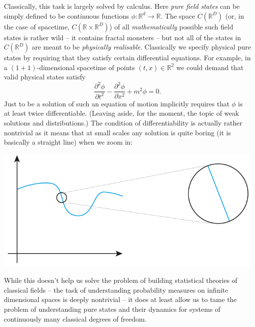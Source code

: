\documentclass[11pt]{amsart}
\theoremstyle{plain}%
\theoremstyle{definition}
\theoremstyle{remark}
\begin{document}
Classically, this task is largely solved by calculus. Here \emph{pure field states} can be simply defined to be continuous functions $\phi:\mathbb{R}^d\rightarrow \mathbb{R}$. The space $C(\mathbb{R}^D)$ (or, in the case of spacetime, $C(\mathbb{R}\times\mathbb{R}^D)$) of all \emph{mathematically} possible such field states is rather wild -- it contains fractal monsters -- but not all of the states in $C(\mathbb{R}^D)$ are meant to be \emph{physically realisable}. Classically we specify physical pure states by requiring that they satisfy certain differential equations. For example, in a $(1+1)$-dimensional spacetime of points $(t,x)\in \mathbb{R}^2$ we could demand that valid physical states satisfy
\begin{equation}
	\frac{\partial^2\phi}{\partial t^2} - \frac{\partial^2\phi}{\partial x^2} + m^2\phi = 0.
\end{equation}
Just to be a solution of such an equation of motion implicitly requires that $\phi$ is at least twice differentiable. (Leaving aside, for the moment, the topic of weak solutions and distributions.) The condition of differentiability is actually rather nontrivial as it means that at small scales any solution is quite boring (it is basically a straight line) when we zoom in:
\begin{center}
\includegraphics{difffunc.pdf}
\end{center}
While this doesn't help us solve the problem of building statistical theories of classical fields -- the task of understanding probability measures on infinite dimensional spaces is deeply nontrivial -- it does at least allow us to tame the problem of understanding pure states and their dynamics for systems of continuously many classical degrees of freedom.
\end{document}
